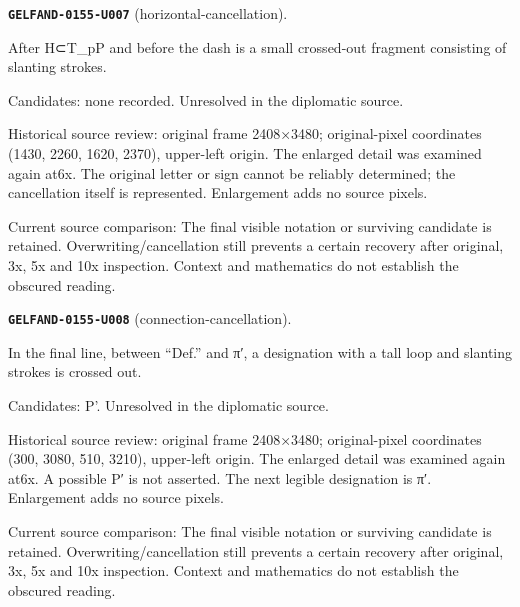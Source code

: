 \medskip
\par\noindent\leavevmode{}\label{GELFAND-0155-U007}\label{GELFAND-P001427:horizontal-cancellation}\textbf{\texttt{GELFAND-0155-U007}} (horizontal-cancellation).\nopagebreak[4]\par
After H⊂T\_pP and before the dash is a small crossed-out fragment consisting of slanting strokes.\par
Candidates: none recorded. Unresolved in the diplomatic source.\par
Historical source review: original frame 2408×3480; original-pixel coordinates (1430, 2260, 1620, 2370), upper-left origin. The enlarged detail was examined again at6x. The original letter or sign cannot be reliably determined; the cancellation itself is represented. Enlargement adds no source pixels.\par
Current source comparison: The final visible notation or surviving candidate is retained. Overwriting/cancellation still prevents a certain recovery after original, 3x, 5x and 10x inspection. Context and mathematics do not establish the obscured reading.\par
\medskip
\par\noindent\leavevmode{}\label{GELFAND-0155-U008}\label{GELFAND-P001427:connection-cancellation}\textbf{\texttt{GELFAND-0155-U008}} (connection-cancellation).\nopagebreak[4]\par
In the final line, between “Def.” and π′, a designation with a tall loop and slanting strokes is crossed out.\par
Candidates: P'. Unresolved in the diplomatic source.\par
Historical source review: original frame 2408×3480; original-pixel coordinates (300, 3080, 510, 3210), upper-left origin. The enlarged detail was examined again at6x. A possible P′ is not asserted. The next legible designation is π′. Enlargement adds no source pixels.\par
Current source comparison: The final visible notation or surviving candidate is retained. Overwriting/cancellation still prevents a certain recovery after original, 3x, 5x and 10x inspection. Context and mathematics do not establish the obscured reading.\par
\medskip
